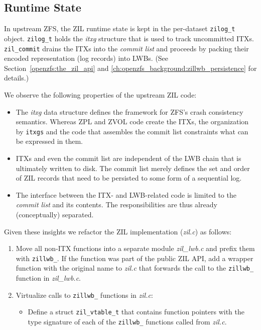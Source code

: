 \documentclass[12pt,a4paper,twoside]{book}
\begin{document}
{\subsection{Runtime State}\label{sec:zil_kinds:runtime}
In upstream ZFS, the ZIL runtime state is kept in the per-dataset \lstinline{zilog_t} object.
\lstinline{zilog_t} holds the \textit{itxg} structure that is used to track uncommitted ITXs.
\lstinline{zil_commit} drains the ITXs into the \textit{commit list} and proceeds by packing their encoded representation (log records) into LWBs.
(See Section~\ref{openzfs:the_zil_api} and \ref{ch:openzfs_background:zillwb_persistence} for details.)

We observe the following properties of the upstream ZIL code:
\begin{itemize}[noitemsep]
    \item The \textit{itxg} data structure defines the framework for ZFS's crash consistency semantics.
          Whereas ZPL and ZVOL code create the ITXs, the organization by \lstinline{itxgs} and the code that assembles the commit list constraints what can be expressed in them.
    \item ITXs and even the commit list are independent of the LWB chain that is ultimately written to disk.
          The commit list merely defines the set and order of ZIL records that need to be persisted to some form of a sequential log.
    \item The interface between the ITX- and LWB-related code is limited to the \textit{commit list} and its contents.
        The responsibilities are thus already (conceptually) separated.
\end{itemize}
Given these insights we refactor the ZIL implementation (\textit{zil.c}) as follows:
\begin{enumerate}[noitemsep]
    \item Move all non-ITX functions into a separate module \textit{zil\_lwb.c} and prefix them with \lstinline{zillwb_}.
          If the function was part of the public ZIL API, add a wrapper function with the original name to \textit{zil.c} that forwards the call to the \lstinline{zillwb_} function in \textit{zil\_lwb.c}.
    \item Virtualize calls to \lstinline{zillwb_} functions in \textit{zil.c}:
          \begin{itemize}
              \item Define a struct \lstinline{zil_vtable_t} that contains function pointers with the type signature of each of the \lstinline{zillwb_} functions called from \textit{zil.c}.

\end{itemize}
\end{enumerate}}
\end{document}
